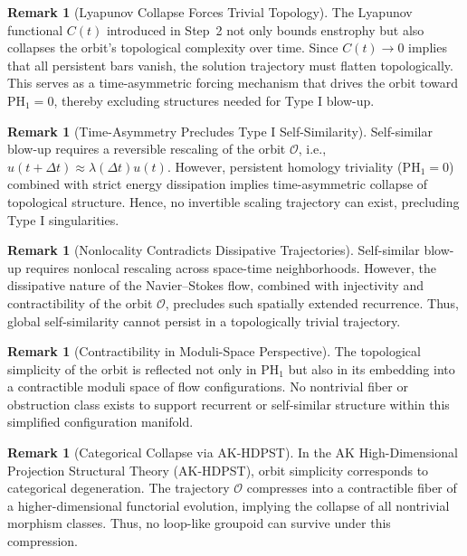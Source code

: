 \documentclass[11pt]{article}
\theoremstyle{definition}
\newtheorem{remark}[theorem]{Remark}
\begin{document}
\begin{remark}[Lyapunov Collapse Forces Trivial Topology]
The Lyapunov functional $C(t)$ introduced in Step~2 not only bounds enstrophy but also collapses the orbit’s topological complexity over time. Since $C(t) \to 0$ implies that all persistent bars vanish, the solution trajectory must flatten topologically. This serves as a time-asymmetric forcing mechanism that drives the orbit toward $\mathrm{PH}_1 = 0$, thereby excluding structures needed for Type I blow-up.
\end{remark}


\begin{remark}[Time-Asymmetry Precludes Type I Self-Similarity]
Self-similar blow-up requires a reversible rescaling of the orbit $\mathcal{O}$, i.e., $u(t+\Delta t) \approx \lambda(\Delta t) u(t)$. However, persistent homology triviality ($\mathrm{PH}_1 = 0$) combined with strict energy dissipation implies time-asymmetric collapse of topological structure. Hence, no invertible scaling trajectory can exist, precluding Type I singularities.
\end{remark}

\begin{remark}[Nonlocality Contradicts Dissipative Trajectories]
Self-similar blow-up requires nonlocal rescaling across space-time neighborhoods. However, the dissipative nature of the Navier--Stokes flow, combined with injectivity and contractibility of the orbit $\mathcal{O}$, precludes such spatially extended recurrence. Thus, global self-similarity cannot persist in a topologically trivial trajectory.
\end{remark}

\begin{remark}[Contractibility in Moduli-Space Perspective]
The topological simplicity of the orbit is reflected not only in $\mathrm{PH}_1$ but also in its embedding into a contractible moduli space of flow configurations. No nontrivial fiber or obstruction class exists to support recurrent or self-similar structure within this simplified configuration manifold.
\end{remark}

\begin{remark}[Categorical Collapse via AK-HDPST]
In the AK High-Dimensional Projection Structural Theory (AK-HDPST), orbit simplicity corresponds to categorical degeneration. The trajectory $\mathcal{O}$ compresses into a contractible fiber of a higher-dimensional functorial evolution, implying the collapse of all nontrivial morphism classes. Thus, no loop-like groupoid can survive under this compression.
\end{remark}
\end{document}
